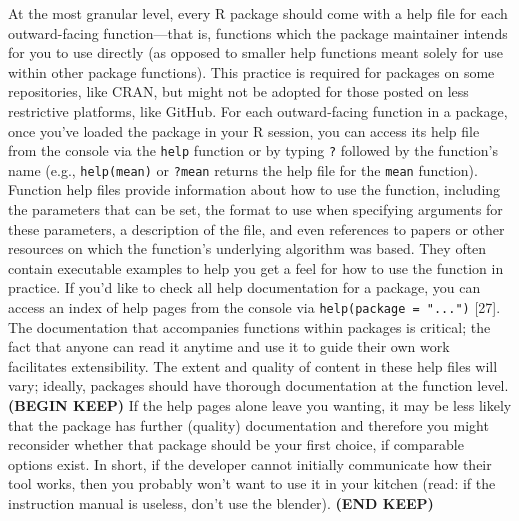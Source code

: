 \documentclass[10pt,letterpaper]{article}
\begin{document}
At the most granular level, every R package should come with a help file
for each outward-facing function---that is, functions which the package
maintainer intends for you to use directly (as opposed to smaller help
functions meant solely for use within other package functions). This
practice is required for packages on some repositories, like CRAN, but
might not be adopted for those posted on less restrictive platforms,
like GitHub. For each outward-facing function in a package, once you've
loaded the package in your R session, you can access its help file from
the console via the \texttt{help} function or by typing \texttt{?}
followed by the function's name (e.g., \texttt{help(mean)} or
\texttt{?mean} returns the help file for the \texttt{mean} function).
Function help files provide information about how to use the function,
including the parameters that can be set, the format to use when
specifying arguments for these parameters, a description of the file,
and even references to papers or other resources on which the function's
underlying algorithm was based. They often contain executable examples
to help you get a feel for how to use the function in practice. If you'd
like to check all help documentation for a package, you can access an
index of help pages from the console via
\texttt{help(package\ =\ "...")} {[}27{]}. The documentation that
accompanies functions within packages is critical; the fact that anyone
can read it anytime and use it to guide their own work facilitates
extensibility. The extent and quality of content in these help files
will vary; ideally, packages should have thorough documentation at the
function level. \textbf{(BEGIN KEEP)} If the help pages alone leave you
wanting, it may be less likely that the package has further (quality)
documentation and therefore you might reconsider whether that package
should be your first choice, if comparable options exist. In short, if
the developer cannot initially communicate how their tool works, then
you probably won't want to use it in your kitchen (read: if the
instruction manual is useless, don't use the blender). \textbf{(END
KEEP)}
\end{document}
